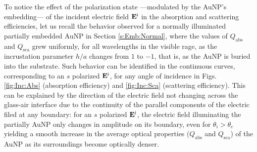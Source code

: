 To notice the effect of the  polarization state ---modulated by the AuNP's embedding--- of the incident electric field $\vb{E}^\text{i}$ in the absorption and scattering efficiencies, let us recall the behavior observed for a normally illuminated partially embedded AuNP in Section \ref{s:Emb:Normal}, where the values of $Q_\text{abs}$ and $Q_\text{sca}$ grew uniformly, for all wavelengths in the visible rage, as the incrustation parameter $h/a$ changes from $1$ to $-1$, that is, as the AuNP is buried into the substrate. Such behavior can be identified in the continuous curves, corresponding to an $s$ polarized $\vb{E}^\text{i}$, for any angle of incidence in Figs. \ref{fig:Inc:Abs} (absorption efficiency) and \ref{fig:Inc:Sca} (scattering efficiency). This can be explained by the direction of the electric field not changing across the glass-air interface due to the continuity of the parallel components of the electric filed at any boundary: for an $s$ polarized $\vb{E}^\text{i}$, the electric field illuminating the partially AuNP only changes in amplitude on its boundary, even for $\theta_i>\theta_c$ yielding a smooth increase in the average optical properties ($Q_\text{abs}$ and $Q_\text{sca}$) of the AuNP as its surroundings become optically denser.

